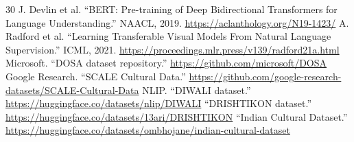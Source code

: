 \documentclass[10pt,a4paper]{article}
\begin{document}
\begin{thebibliography}{30}
 J. Devlin et al. ``BERT: Pre-training of Deep Bidirectional Transformers for Language Understanding.'' NAACL, 2019. \url{https://aclanthology.org/N19-1423/}
 A. Radford et al. ``Learning Transferable Visual Models From Natural Language Supervision.'' ICML, 2021. \url{https://proceedings.mlr.press/v139/radford21a.html}
 Microsoft. ``DOSA dataset repository.'' \url{https://github.com/microsoft/DOSA}
 Google Research. ``SCALE Cultural Data.'' \url{https://github.com/google-research-datasets/SCALE-Cultural-Data}
 NLIP. ``DIWALI dataset.'' \url{https://huggingface.co/datasets/nlip/DIWALI}
 ``DRISHTIKON dataset.'' \url{https://huggingface.co/datasets/13ari/DRISHTIKON}
 ``Indian Cultural Dataset.'' \url{https://huggingface.co/datasets/ombhojane/indian-cultural-dataset}
\end{thebibliography}
\endgroup
\end{document}
